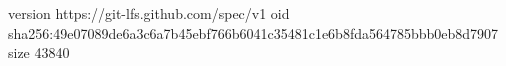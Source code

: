 version https://git-lfs.github.com/spec/v1
oid sha256:49e07089de6a3c6a7b45ebf766b6041c35481c1e6b8fda564785bbb0eb8d7907
size 43840
